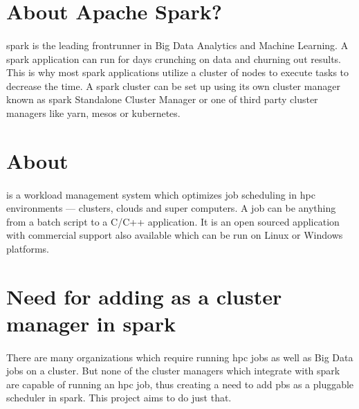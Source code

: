 
\section{About Apache Spark?}

\paragraph{} \Gls{spark} is the leading frontrunner in Big Data Analytics and
Machine Learning. A \gls{spark} application can run for days crunching on data
and churning out results. This is why most \gls{spark} applications utilize a
cluster of nodes to execute tasks to decrease the time. A \gls{spark} cluster
can be set up using its own cluster manager known as \gls{spark} Standalone
Cluster Manager or one of third party cluster managers like \gls{yarn},
\gls{mesos} or \gls{kubernetes}.


\section{About }

\paragraph{}  is a workload management system which optimizes
\gls{job} scheduling in \gls{hpc} environments --- clusters, clouds and super
computers. A  job can be anything from a batch script to a C/C++
application. It is an open sourced application with commercial support also
available which can be run on Linux or Windows platforms.


\section{Need for adding  as a cluster manager in \gls{spark}}

\paragraph{} There are many organizations which require running \gls{hpc} jobs
as well as Big Data jobs on a cluster. But none of the cluster managers which
integrate with \gls{spark} are capable of running an \gls{hpc} job, thus
creating a need to add \gls{pbs} as a pluggable scheduler in \gls{spark}. This
project aims to do just that.
